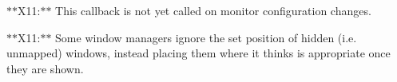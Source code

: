 
\begin{DoxyRefList}
\item[\label{bug__bug000001}%
\hypertarget{bug__bug000001}{}%
\-Member \hyperlink{group__monitor_gacfa9978e57c73670577d530df23bf275}{glfw\-Set\-Monitor\-Callback} (\-G\-L\-F\-Wmonitorfun cbfun)]$\ast$$\ast$\-X11\-:$\ast$$\ast$ \-This callback is not yet called on monitor configuration changes. 
\item[\label{bug__bug000002}%
\hypertarget{bug__bug000002}{}%
\-Member \hyperlink{group__window_ga0dc8d880a0d87be16d3ea8114561f6f0}{glfw\-Set\-Window\-Pos} (\-G\-L\-F\-Wwindow $\ast$window, int xpos, int ypos)]$\ast$$\ast$\-X11\-:$\ast$$\ast$ \-Some window managers ignore the set position of hidden (i.\-e. unmapped) windows, instead placing them where it thinks is appropriate once they are shown.
\end{DoxyRefList}